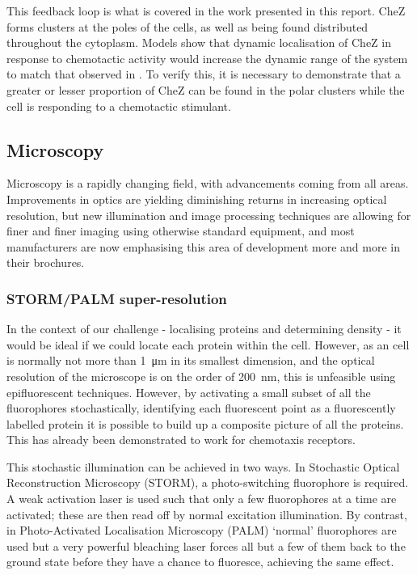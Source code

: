 \documentclass[../main.tex]{subfiles}
\begin{document}
This feedback loop is what is covered in the work presented in this report. CheZ forms clusters at the poles of the cells, as well as being found distributed throughout the cytoplasm. Models show that dynamic localisation of CheZ in response to chemotactic activity would increase the dynamic range of the system to match that observed in \ecoli\citep{lipkow06}. To verify this, it is necessary to demonstrate that a greater or lesser proportion of CheZ can be found in the polar clusters while the cell is responding to a chemotactic stimulant.

\subsection{Microscopy}

Microscopy is a rapidly changing field, with advancements coming from all areas. Improvements in optics are yielding diminishing returns in increasing optical resolution, but new illumination and image processing techniques are allowing for finer and finer imaging using otherwise standard equipment, and most manufacturers are now emphasising this area of development more and more in their brochures.

\subsubsection{STORM/PALM super-resolution}
In the context of our challenge - localising proteins and determining density - it would be ideal if we could locate each protein within the \ecoli cell. However, as an \ecoli cell is normally not more than \SI{1}{\micro\meter} in its smallest dimension, and the optical resolution of the microscope is on the order of \SI{200}{\nano\meter}, this is unfeasible using epifluorescent techniques. However, by activating a small subset of all the fluorophores stochastically, identifying each fluorescent point as a fluorescently labelled protein it is possible to build up a composite picture of all the proteins. This has already been demonstrated to work for \ecoli chemotaxis receptors\citep{greenfield09}.

This stochastic illumination can be achieved in two ways. In Stochastic Optical Reconstruction Microscopy (STORM), a photo-switching fluorophore is required. A weak activation laser is used such that only a few fluorophores at a time are activated; these are then read off by normal excitation illumination. By contrast, in Photo-Activated Localisation Microscopy (PALM) `normal' fluorophores are used but a very powerful bleaching laser forces all but a few of them back to the ground state before they have a chance to fluoresce, achieving the same effect.
\end{document}

